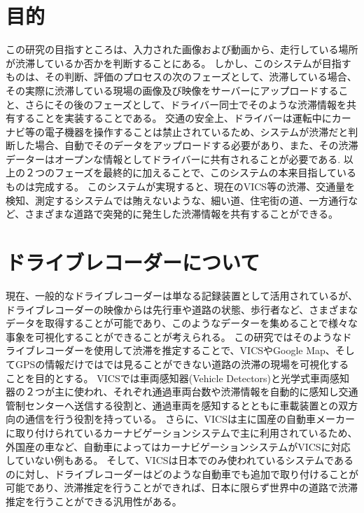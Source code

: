 \section{目的}
この研究の目指すところは、入力された画像および動画から、走行している場所が渋滞しているか否かを判断することにある。
しかし、このシステムが目指すものは、その判断、評価のプロセスの次のフェーズとして、渋滞している場合、その実際に渋滞している現場の画像及び映像をサーバーにアップロードすること、さらにその後のフェーズとして、ドライバー同士でそのような渋滞情報を共有することを実装することである。
交通の安全上、ドライバーは運転中にカーナビ等の電子機器を操作することは禁止されているため、システムが渋滞だと判断した場合、自動でそのデータをアップロードする必要があり、また、その渋滞データーはオープンな情報としてドライバーに共有されることが必要である.
以上の２つのフェーズを最終的に加えることで、このシステムの本来目指しているものは完成する。
このシステムが実現すると、現在のVICS等の渋滞、交通量を検知、測定するシステムでは賄えないような、細い道、住宅街の道、一方通行など、さまざまな道路で突発的に発生した渋滞情報を共有することができる。

\section{ドライブレコーダーについて}
現在、一般的なドライブレコーダーは単なる記録装置として活用されているが、ドライブレコーダーの映像からは先行車や道路の状態、歩行者など、さまざまなデータを取得することが可能であり、このようなデーターを集めることで様々な事象を可視化することができることが考えられる。
この研究ではそのようなドライブレコーダーを使用して渋滞を推定することで、VICSやGoogle Map、そしてGPSの情報だけではでは見ることができない道路の渋滞の現場を可視化することを目的とする。
VICSでは車両感知器(Vehicle Detectors)と光学式車両感知器の２つが主に使われ、それぞれ通過車両台数や渋滞情報を自動的に感知し交通管制センターへ送信する役割と、通過車両を感知するとともに車載装置との双方向の通信を行う役割を持っている。
さらに、VICSは主に国産の自動車メーカーに取り付けられているカーナビゲーションシステムで主に利用されているため、外国産の車など、自動車によってはカーナビゲーションシステムがVICSに対応していない例もある。
そして、VICSは日本でのみ使われているシステムであるのに対し、ドライブレコーダーはどのような自動車でも追加で取り付けることが可能であり、渋滞推定を行うことができれば、日本に限らず世界中の道路で渋滞推定を行うことができる汎用性がある。



